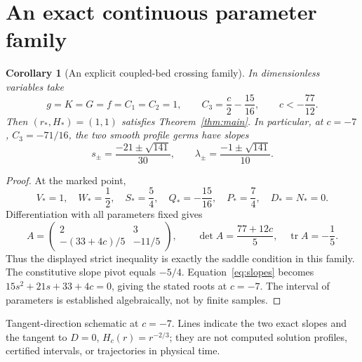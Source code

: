 \documentclass[11pt]{article}
\newtheorem{corollary}[theorem]{Corollary}
\theoremstyle{remark}\newtheorem{remark}[theorem]{Remark}
\begin{document}
\section{An exact continuous parameter family}
\begin{corollary}[An explicit coupled-bed crossing family]\label{cor:example}
In dimensionless variables take
\[
g=K=G=f=C_1=C_2=1,\qquad C_3=\frac{c}{2}-\frac{15}{16},\qquad
c<-\frac{77}{12}.
\]
Then $(r_*,H_*)=(1,1)$ satisfies Theorem~\ref{thm:main}. In particular, at
$c=-7$, $C_3=-71/16$, the two smooth profile germs have slopes
\[
s_\pm=\frac{-21\pm\sqrt{141}}{30},\qquad
\lambda_\pm=\frac{-1\pm\sqrt{141}}{10}.
\]
\end{corollary}
\begin{proof}
At the marked point,
\[
V_*=1,\quad W_*=\frac{1}{2},\quad S_*=\frac{5}{4},\quad
Q_*=-\frac{15}{16},\quad P_*=\frac{7}{4},\quad D_*=N_*=0.
\]
Differentiation with all parameters fixed gives
\[
A=\begin{pmatrix}2&3\\-(33+4c)/5&-11/5\end{pmatrix},\qquad
\det A=\frac{77+12c}{5},\quad\operatorname{tr}A=-\frac{1}{5}.
\]
Thus the displayed strict inequality is exactly the saddle condition in this
family. The constitutive slope pivot equals $-5/4$. Equation~\eqref{eq:slopes}
becomes $15s^2+21s+33+4c=0$, giving the stated roots at $c=-7$.
The interval of parameters is established algebraically, not by finite samples.
\end{proof}

\begin{center}

\small Tangent-direction schematic at $c=-7$. Lines indicate the two exact
slopes and the tangent to $D=0$, $H_c(r)=r^{-2/3}$; they are not computed
solution profiles, certified intervals, or trajectories in physical time.
\end{center}
\end{document}
